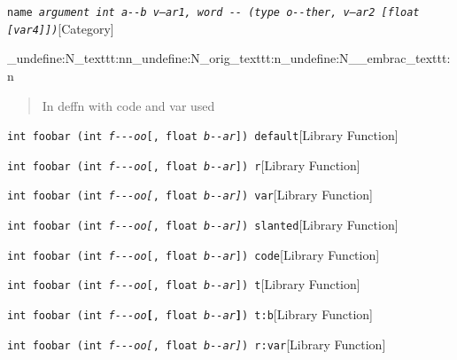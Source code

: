 \documentclass{book}
\begin{document}
\noindent\texttt{name \EmbracOn{}\textnormal{\textsl{argument \texttt{int} \texttt{a{-}{-}b} \textsl{v--ar1}, word \texttt{{-}{-}} (\texttt{type o{-}{-}ther}, \textsl{v---ar2}  [\texttt{float} [\textsl{var4}]])}}\EmbracOff{}}\hfill[Category]


\ExplSyntaxOn%
\cs_undefine:N{\embrac_texttt:nn}\cs_undefine:N{\embrac_orig_texttt:n}\cs_undefine:N{\__embrac_texttt:n}%
\ExplSyntaxOff%
%
\begin{quote}
\unskip{\parskip=0pt\noindent}%
In deffn with code and var used
\end{quote}

\noindent\texttt{int foobar (int \textsl{f{-}{-}{-}oo}[, float \textsl{b{-}{-}ar}]) default}\hfill[Library Function]



%
\noindent\texttt{int foobar (int \textsl{f{-}{-}{-}oo}\textnormal{[}, float \textsl{b{-}{-}ar}\textnormal{]}) r}\hfill[Library Function]



%
\noindent\texttt{int foobar (int \textsl{f{-}{-}{-}oo}\textsl{[}, float \textsl{b{-}{-}ar}\textsl{]}) var}\hfill[Library Function]



%
\noindent\texttt{int foobar (int \textsl{f{-}{-}{-}oo}\textsl{[}, float \textsl{b{-}{-}ar}\textsl{]}) slanted}\hfill[Library Function]



%
\noindent\texttt{int foobar (int \textsl{f{-}{-}{-}oo}\texttt{[}, float \textsl{b{-}{-}ar}\texttt{]}) code}\hfill[Library Function]



%
\noindent\texttt{int foobar (int \textsl{f{-}{-}{-}oo}\texttt{[}, float \textsl{b{-}{-}ar}\texttt{]}) t}\hfill[Library Function]



%
\noindent\texttt{int foobar (int \textsl{f{-}{-}{-}oo}\texttt{\textbf{[}}, float \textsl{b{-}{-}ar}\texttt{\textbf{]}}) t:b}\hfill[Library Function]



%
\noindent\texttt{int foobar (int \textsl{f{-}{-}{-}oo}\textnormal{\textsl{[}}, float \textsl{b{-}{-}ar}\textnormal{\textsl{]}}) r:var}\hfill[Library Function]
\end{document}
